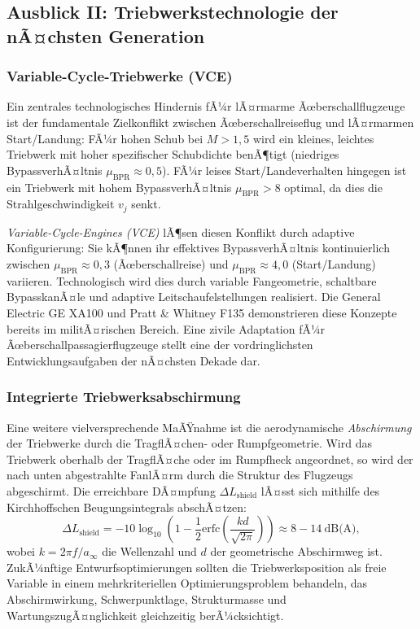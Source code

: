 ﻿\documentclass[12pt,a4paper]{article}
\theoremstyle{definition}
\theoremstyle{remark}
\begin{document}
\subsection{Ausblick II: Triebwerkstechnologie der nÃ¤chsten Generation}
\label{sec:ausblick_triebwerk}

\subsubsection{Variable-Cycle-Triebwerke (VCE)}

Ein zentrales technologisches Hindernis fÃ¼r lÃ¤rmarme Ãœberschallflugzeuge ist der
fundamentale Zielkonflikt zwischen Ãœberschallreiseflug und lÃ¤rmarmen Start/Landung:
FÃ¼r hohen Schub bei $M > 1{,}5$ wird ein kleines, leichtes Triebwerk mit hoher
spezifischer Schubdichte benÃ¶tigt (niedriges BypassverhÃ¤ltnis $\mu_\text{BPR} \approx 0{,}5$).
FÃ¼r leises Start/Landeverhalten hingegen ist ein Triebwerk mit hohem BypassverhÃ¤ltnis
$\mu_\text{BPR} > 8$ optimal, da dies die Strahlgeschwindigkeit $v_j$ senkt.

\emph{Variable-Cycle-Engines (VCE)} lÃ¶sen diesen Konflikt durch adaptive Konfigurierung:
Sie kÃ¶nnen ihr effektives BypassverhÃ¤ltnis kontinuierlich zwischen $\mu_\text{BPR} \approx 0{,}3$
(Ãœberschallreise) und $\mu_\text{BPR} \approx 4{,}0$ (Start/Landung) variieren. Technologisch
wird dies durch variable Fangeometrie, schaltbare BypasskanÃ¤le und adaptive
Leitschaufelstellungen realisiert. Die General Electric GE XA100 und Pratt \& Whitney
F135 demonstrieren diese Konzepte bereits im militÃ¤rischen Bereich. Eine zivile Adaptation
fÃ¼r Ãœberschallpassagierflugzeuge stellt eine der vordringlichsten Entwicklungsaufgaben der
nÃ¤chsten Dekade dar.

\subsubsection{Integrierte Triebwerksabschirmung}

Eine weitere vielversprechende MaÃŸnahme ist die aerodynamische \emph{Abschirmung} der
Triebwerke durch die TragflÃ¤chen- oder Rumpfgeometrie. Wird das Triebwerk oberhalb der
TragflÃ¤che oder im Rumpfheck angeordnet, so wird der nach unten abgestrahlte
FanlÃ¤rm durch die Struktur des Flugzeugs abgeschirmt. Die erreichbare DÃ¤mpfung
$\Delta L_\text{shield}$ lÃ¤sst sich mithilfe des Kirchhoffschen Beugungsintegrals abschÃ¤tzen:
\begin{equation}
  \Delta L_\text{shield} = -10 \log_{10}\!\left(1 - \frac{1}{2}\mathrm{erfc}\!\left(
      \frac{kd}{\sqrt{2\pi}}\right)\right) \approx 8{-}14\ \text{dB(A)},
  \label{eq:abschirmung}
\end{equation}
wobei $k = 2\pi f/a_\infty$ die Wellenzahl und $d$ der geometrische Abschirmweg ist.
ZukÃ¼nftige Entwurfsoptimierungen sollten die Triebwerksposition als freie Variable
in einem mehrkriteriellen Optimierungsproblem behandeln, das Abschirmwirkung,
Schwerpunktlage, Strukturmasse und WartungszugÃ¤nglichkeit gleichzeitig berÃ¼cksichtigt.
\end{document}
